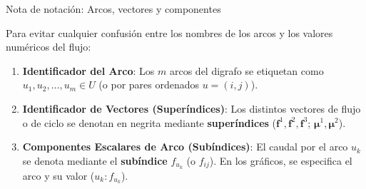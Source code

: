 \documentclass[
  ignorenonframetext,
]{beamer}
\providecommand{\tightlist}{%
  \setlength{\itemsep}{0pt}\setlength{\parskip}{0pt}}
\begin{document}
\begin{frame}{Nota de notación: Arcos, vectores y componentes}
\label{nota-de-notaciuxf3n-arcos-vectores-y-componentes}
\begin{tcolorbox}[enhanced jigsaw, opacityback=0, breakable, title=\textcolor{quarto-callout-note-color}{\faInfo}\hspace{0.5em}{Distinción entre arcos, vectores y componentes}, colback=white, colbacktitle=quarto-callout-note-color!10!white, bottomrule=.15mm, opacitybacktitle=0.6, coltitle=black, bottomtitle=1mm, leftrule=.75mm, colframe=quarto-callout-note-color-frame, toptitle=1mm, titlerule=0mm, rightrule=.15mm, left=2mm, arc=.35mm, toprule=.15mm]

Para evitar cualquier confusión entre los nombres de los arcos y los
valores numéricos del flujo:

\begin{enumerate}
\tightlist
\item
  \textbf{Identificador del Arco}: Los \(m\) arcos del digrafo se
  etiquetan como \(u_1, u_2, \dots, u_m \in U\) (o por pares ordenados
  \(u = (i, j)\)).
\item
  \textbf{Identificador de Vectores (Superíndices)}: Los distintos
  vectores de flujo o de ciclo se denotan en negrita mediante
  \textbf{superíndices} (\(\mathbf{f}^1, \mathbf{f}^2, \mathbf{f}^3\);
  \(\mathbf{\mu}^1, \mathbf{\mu}^2\)).
\item
  \textbf{Componentes Escalares de Arco (Subíndices)}: El caudal por el
  arco \(u_k\) se denota mediante el \textbf{subíndice} \(f_{u_k}\) (o
  \(f_{ij}\)). En los gráficos, se especifica el arco y su valor
  (\(u_k: f_{u_k}\)).
\end{enumerate}

\end{tcolorbox}
\end{frame}
\end{document}
